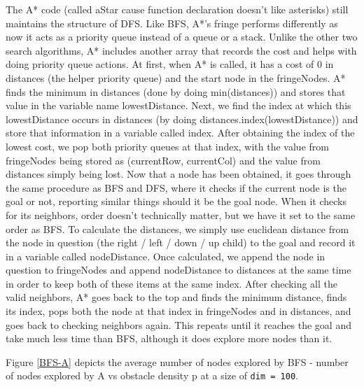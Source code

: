\documentclass[11pt]{article}
\begin{document}
The A* code (called aStar cause function declaration doesn't like asterisks) still maintains the structure of DFS. Like BFS, A*'s fringe performs differently as now it acts as a priority queue instead of a queue or a stack. Unlike the other two search algorithms, A* includes another array that records the cost and helps with doing priority queue actions. At first, when A* is called, it has a cost of 0 in distances (the helper priority queue) and the start node in the fringeNodes. A* finds the minimum in distances (done by doing min(distances)) and stores that value in the variable name lowestDistance. Next, we find the index at which this lowestDistance occurs in distances (by doing distances.index(lowestDistance)) and store that information in a variable called index. After obtaining the index of the lowest cost, we pop both priority queues at that index, with the value from fringeNodes being stored as (currentRow, currentCol) and the value from distances simply being lost.
Now that a node has been obtained, it goes through the same procedure as BFS and DFS, where it checks if the current node is the goal or not, reporting similar things should it be the goal node. When it checks for its neighbors, order doesn't technically matter, but we have it set to the same order as BFS. To calculate the distances, we simply use euclidean distance from the node in question (the right / left / down / up child) to the goal and record it in a variable called nodeDistance. Once calculated, we append the node in question to fringeNodes and append nodeDistance to distances at the same time in order to keep both of these items at the same index. After checking all the valid neighbors, A* goes back to the top and finds the minimum distance, finds its index, pops both the node at that index in fringeNodes and in distances, and goes back to checking neighbors again. This repeats until it reaches the goal and take much less time than BFS, although it does explore more nodes than it. 

Figure \ref{BFS-A} depicts the average number of nodes explored by BFS - number of nodes explored by A\text{*} vs obstacle density p at a size of \texttt{dim = 100}.
\end{document}
